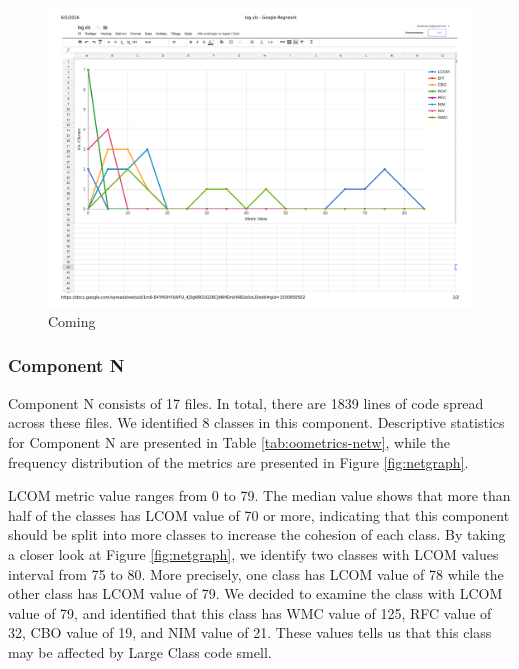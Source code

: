 \begin{landscape}
\setlength\LTleft{-.5in}
	\begin{figure}
	\centering
	\includegraphics[width=\textwidth]{images/pdf/log.pdf}
	\caption{Coming}
	\label{fig:loggraph}
	\end{figure}
\end{landscape}







\subsubsection{Component N}
Component N consists of 17 files. In total, there are 1839 lines of code spread across these files. We identified 8 classes in this component. Descriptive statistics for Component N are presented in Table \ref{tab:oometrics-netw}, while the frequency distribution of the metrics are presented in Figure \ref{fig:netgraph}.

LCOM metric value ranges from 0 to 79. The median value shows that more than half of the classes has LCOM value of 70 or more, indicating that this component should be split into more classes to increase the cohesion of each class. By taking a closer look at Figure \ref{fig:netgraph}, we identify two classes with LCOM values interval from 75 to 80. More precisely, one class has LCOM value of 78 while the other class has LCOM value of 79. We decided to examine the class with LCOM value of 79, and identified that this class has WMC value of 125, RFC value of 32, CBO value of 19, and NIM value of 21. These values tells us that this class may be affected by Large Class code smell.


